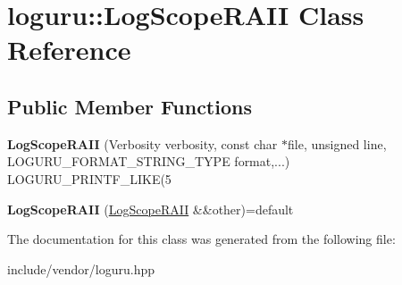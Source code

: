 \hypertarget{classloguru_1_1_log_scope_r_a_i_i}{}\section{loguru\+:\+:Log\+Scope\+R\+A\+II Class Reference}
\label{classloguru_1_1_log_scope_r_a_i_i}
\subsection*{Public Member Functions}
\begin{DoxyCompactItemize}
\item 
\mbox{\label{classloguru_1_1_log_scope_r_a_i_i_a859bd0bf34492be2ec0a7d6a69c54c05}} 
{\bfseries Log\+Scope\+R\+A\+II} (Verbosity verbosity, const char $\ast$file, unsigned line, L\+O\+G\+U\+R\+U\+\_\+\+F\+O\+R\+M\+A\+T\+\_\+\+S\+T\+R\+I\+N\+G\+\_\+\+T\+Y\+PE format,...) L\+O\+G\+U\+R\+U\+\_\+\+P\+R\+I\+N\+T\+F\+\_\+\+L\+I\+KE(5
\item 
\mbox{\label{classloguru_1_1_log_scope_r_a_i_i_a64fa974a1e1128950bf9b99fda28253b}} 
{\bfseries Log\+Scope\+R\+A\+II} (\mbox{\hyperlink{classloguru_1_1_log_scope_r_a_i_i}{Log\+Scope\+R\+A\+II}} \&\&other)=default
\end{DoxyCompactItemize}


The documentation for this class was generated from the following file\+:\begin{DoxyCompactItemize}
\item 
include/vendor/loguru.\+hpp\end{DoxyCompactItemize}
